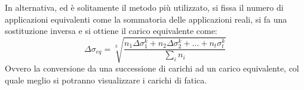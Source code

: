 				In alternativa, ed è solitamente il metodo più utilizzato, si fissa il numero di applicazioni equivalenti come la sommatoria delle applicazioni reali, si fa una sostituzione inversa e si ottiene il carico equivalente come:
				\[\Delta\sigma_{eq} = \sqrt[k]{\dfrac{n_1\Delta\sigma_1^k + n_2\Delta\sigma_2^k + \dots + n_t\sigma_t^k }{\sum_in_i}}\]		
				Ovvero la conversione da una successione di carichi ad un carico equivalente, col quale meglio si potranno visualizzare i carichi di fatica. 
				
			
